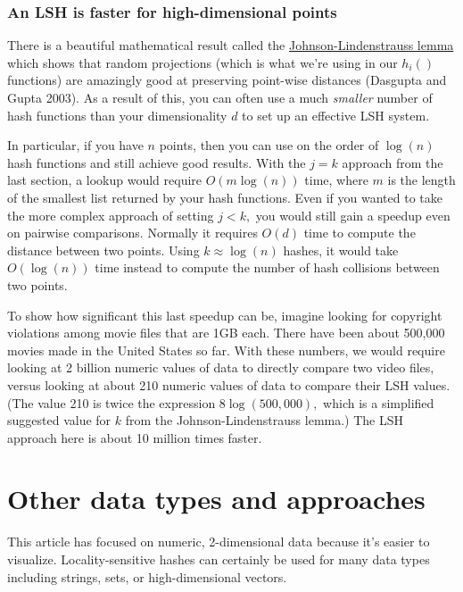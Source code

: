 \documentclass[20pt,]{extarticle}
\begin{document}
\subsubsection{An LSH is faster for high-dimensional
points}\label{an-lsh-is-faster-for-high-dimensional-points}

There is a beautiful mathematical result called the
\href{https://en.wikipedia.org/wiki/Johnson\%E2\%80\%93Lindenstrauss_lemma}{Johnson-Lindenstrauss
lemma} which shows that random projections (which is what we're using in
our \(h_i()\) functions) are amazingly good at preserving point-wise
distances (Dasgupta and Gupta 2003). As a result of this, you can often
use a much \emph{smaller} number of hash functions than your
dimensionality \(d\) to set up an effective LSH system.

In particular, if you have \(n\) points, then you can use on the order
of \(\log(n)\) hash functions and still achieve good results. With the
\(j=k\) approach from the last section, a lookup would require
\(O(m\log(n))\) time, where \(m\) is the length of the smallest list
returned by your hash functions. Even if you wanted to take the more
complex approach of setting \(j < k,\) you would still gain a speedup
even on pairwise comparisons. Normally it requires \(O(d)\) time to
compute the distance between two points. Using \(k \approx \log(n)\)
hashes, it would take \(O(\log(n))\) time instead to compute the number
of hash collisions between two points.

To show how significant this last speedup can be, imagine looking for
copyright violations among movie files that are 1GB each. There have
been about 500,000 movies made in the United States so far. With these
numbers, we would require looking at 2 billion numeric values of data to
directly compare two video files, versus looking at about 210 numeric
values of data to compare their LSH values. (The value 210 is twice the
expression \(8\log(500,000),\) which is a simplified suggested value for
\(k\) from the Johnson-Lindenstrauss lemma.) The LSH approach here is
about 10 million times faster.

\section{Other data types and
approaches}\label{other-data-types-and-approaches}

This article has focused on numeric, 2-dimensional data because it's
easier to visualize. Locality-sensitive hashes can certainly be used for
many data types including strings, sets, or high-dimensional vectors.
\end{document}
